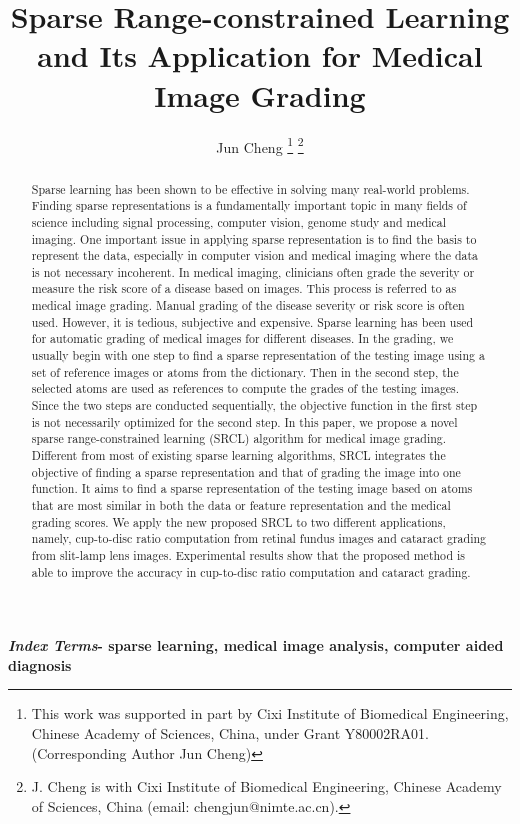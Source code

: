 \documentclass[journal]{IEEEtran}
\title{ Sparse Range-constrained Learning and Its Application for Medical Image Grading}
\author{Jun Cheng
 \thanks{This work was supported in part by  Cixi Institute of Biomedical Engineering, Chinese Academy of Sciences, China, under Grant Y80002RA01. (Corresponding Author Jun Cheng) }
\thanks{  J. Cheng is with Cixi Institute of Biomedical Engineering, Chinese Academy of Sciences, China (email: chengjun@nimte.ac.cn).}
 }
\begin{document}

\maketitle

%
 \begin{abstract}Sparse learning has been shown to be effective in
 	solving many real-world problems. Finding sparse representations
 	is a fundamentally important topic in many fields of
 	science including signal processing, computer vision, genome
 	study and medical imaging. One important issue in applying
 	sparse representation is to find the basis to represent the data,
 	especially in computer vision and medical imaging where the
 	data is not necessary incoherent. In medical imaging, clinicians
 	often grade the severity or measure the risk score of a disease
 	based on images. This process is referred to as medical image
 	grading. Manual grading of the disease severity or risk score
 	is often used. However, it is tedious, subjective and expensive.
 	Sparse learning has been used for automatic grading of medical
 	images for different diseases. In the grading, we usually begin
 	with one step to find a sparse representation of the testing image
 	using a set of reference images or atoms from the dictionary. Then
 	in the second step, the selected atoms are used as references to
 	compute the grades of the testing images. Since the two steps
 	are conducted sequentially, the objective function in the first
 	step is not necessarily optimized for the second step. In this
 	paper, we propose a novel sparse range-constrained learning
 	(SRCL) algorithm for medical image grading. Different from
 	most of existing sparse learning algorithms, SRCL integrates
 	the objective of finding a sparse representation and that of
 	grading the image into one function. It aims to find a sparse
 	representation of the testing image based on atoms that are
 	most similar in both the data or feature representation and the
 	medical grading scores. We apply the new proposed SRCL to
 	two different applications, namely, cup-to-disc ratio computation
 	from retinal fundus images and cataract grading from slit-lamp
 	lens images. Experimental results show that the proposed method
 	is able to improve the accuracy in cup-to-disc ratio computation
 	and cataract grading.




 \end{abstract}
  \textbf{\emph{Index Terms}-
   sparse learning, medical image analysis, computer aided diagnosis}
\end{document}
